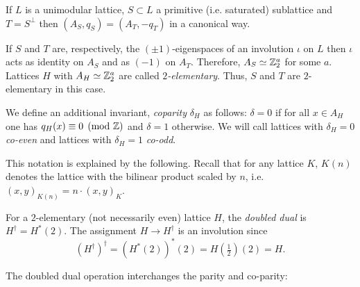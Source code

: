 \documentclass{amsart}
\begin{document}
If $L$ is a unimodular lattice, $S\subset L$ a primitive
(i.e. saturated) sublattice and $T=S^\perp$ then $(A_S, q_S) = (A_T,
-q_T)$ in a canonical way.

\begin{num}\label{{num:invo-2el}}

If $S$ and $T$ are, respectively, the $(\pm 1)$-eigenspaces
of an involution $\iota$ on $L$ then $\iota$ acts as identity on $A_S$
and as $(-1)$ on $A_T$. Therefore, $A_S\simeq{\mathbb Z}_2^a$ for some
$a$. Lattices $H$ with $A_H\simeq{\mathbb Z}_2^a$ are called
\emph{$2$-elementary}. Thus, $S$ and $T$ are $2$-elementary in this
case.
\end{num}

\begin{definition}
  We define an additional invariant, \emph{coparity} $\delta_H$
  as follows: $\delta=0$ if for all $x\in A_H$ one has
  $q_H(x) \equiv 0\pmod{{\mathbb Z}}$ and $\delta=1$ otherwise. We will call
  lattices with $\delta_H=0$ \emph{co-even} and lattices with
  $\delta_H=1$ \emph{co-odd}.
\end{definition}

This notation is explained by the following. Recall that for any
lattice $K$, $K(n)$ denotes the lattice with the bilinear product
scaled by $n$, i.e. $(x,y)_{K(n)} = n\cdot (x,y)_K$.

\begin{definition}\label{def:doubled-dual}
  For a $2$-elementary (not necessarily even) lattice $H$, the {\it doubled
  dual} is $H^\dag = H^*(2)$. The assignment $H\to H^\dag$ is an involution since
  $$(H^\dag)^\dag = \left(H^*(2) \right)^* (2) = H(\tfrac12)(2) = H.$$
\end{definition}

The doubled dual operation interchanges the parity and co-parity:
\end{document}
